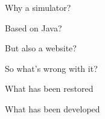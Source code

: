 
\begin{frame}{Why a simulator?}
  
\end{frame}


\begin{frame}{Based on Java?}
  
\end{frame}


\begin{frame}{But also a website?}
  
\end{frame}


\begin{frame}{So what's wrong with it?}
  
\end{frame}


\begin{frame}{What has been restored}
  
\end{frame}



\begin{frame}{What has been developed}
  
\end{frame}

